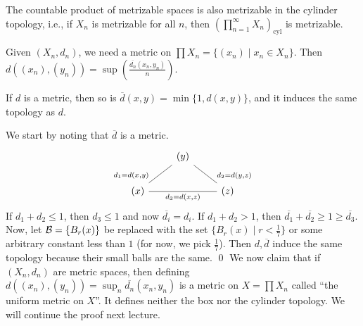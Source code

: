 \begin{simplethm}
    The countable product of metrizable spaces is also metrizable in the cylinder topology, i.e., if $X_n$ is metrizable for all $n$, then $\left(\prod_{n=1}^\infty X_n\right)_\mathrm{cyl}$ is metrizable.
\end{simplethm}
\noindent Given $(X_n, d_n)$, we need a metric on $\prod X_n = \{(x_n) \mid x_n \in X_n\}$. Then $d\left((x_n), (y_n)\right) = \sup\left( \frac{\overline{d_n}(x_n, y_n)}{n} \right)$.
\begin{simplelemma}
    If $d$ is a metric, then so is $\overline{d}(x, y) = \min\{1, d(x, y)\}$, and it induces the same topology as $d$.
\end{simplelemma}
\noindent We start by noting that $\overline{d}$ is a metric.
\[\begin{tikzcd}
	& {(y)} \\
	{(x)} && {(z)}
	\arrow["{d_1 = d(x,y)}"'{pos=0.9}, no head, from=1-2, to=2-1]
	\arrow["{d_2 = d(y,z)}"{pos=0.9}, no head, from=1-2, to=2-3]
	\arrow["{d_3 = d(x,z)}"', no head, from=2-1, to=2-3]
\end{tikzcd}\]
If $d_1 + d_2 \leq 1$, then $d_3 \leq 1$ and now $\overline{d_i} = d_i$. If $d_1 + d_2 > 1$, then $\overline{d_1} + \overline{d_2} \geq 1 \geq \overline{d_3}$. Now, let $\mathcal B = \{B_r(x)\}$ be replaced with the set $\{B_r(x) \mid r < \frac{1}{7}\}$ or some arbitrary constant less than $1$ (for now, we pick $\frac{1}{7}$). Then $d, \overline{d}$ induce the same topology because their small balls are the same. \qed
\medskip\newline
\noindent We now claim that if $(X_n, d_n)$ are metric spaces, then defining $d((x_n), (y_n)) = \sup_n \overline{d_n}(x_n, y_n)$ is a metric on $X = \prod X_n$ called ``the uniform metric on $X$''. It defines neither the box nor the cylinder topology.
\medskip\newline
\noindent We will continue the proof next lecture.